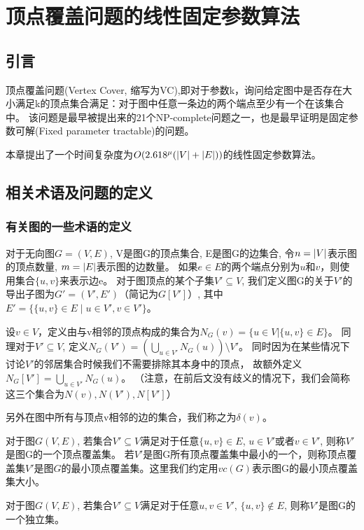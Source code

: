 \chapter{顶点覆盖问题的线性固定参数算法}
\section{引言}
顶点覆盖问题(Vertex Cover, 缩写为VC),即对于参数k，询问给定图中是否存在大小满足k的顶点集合满足：对于图中任意一条边的两个端点至少有一个在该集合中。
该问题是最早被提出来的21个NP-complete问题之一\cite{karp1972reducibility}，也是最早证明是固定参数可解(Fixed parameter tractable)的问题\cite{downey2012parameterized}。

本章提出了一个时间复杂度为$O(2.618^{\mu}(\left\vert V \right\vert + \left\vert E \right\vert))$的线性固定参数算法。

\section{相关术语及问题的定义}
\subsection{有关图的一些术语的定义}
对于无向图$G=(V,E)$, V是图G的顶点集合, E是图G的边集合, 令$n = \left\vert V \right\vert$表示图的顶点数量, $m = \left\vert E \right\vert$表示图的边数量。
如果$e \in E$的两个端点分别为$u$和$v$，则使用集合$\{u, v \}$来表示边e。
对于图顶点的某个子集$V' \subseteq V$, 我们定义图G的关于$V'$的导出子图为$G' = (V', E')$（简记为$G[V']$）, 其中$E' = \{\{u, v\} \in E\;|\;u \in V', v \in V' \}$。

设$v \in V$，定义由与v相邻的顶点构成的集合为$N_{G}(v) = \{ u \in V | \{u, v\} \in E\}$。
同理对于$V' \subseteq V$, 定义$N_{G}(V') = (\bigcup_{u \in V'}N_{G}(u)) \setminus V' $。
同时因为在某些情况下讨论$V'$的邻居集合时候我们不需要排除其本身中的顶点，
故额外定义$N_{G}[V'] = \bigcup_{u \in V'}N_{G}(u)$。
（注意，在前后文没有歧义的情况下，我们会简称这三个集合为$N(v), N(V'),N[V']$）

另外在图中所有与顶点v相邻的边的集合，我们称之为$\delta(v)$。

\begin{definition}[顶点覆盖集]
对于图$G(V, E)$, 若集合$V' \subseteq V$满足对于任意$\{u, v\} \in E$, $u \in V'$或者$v \in V'$, 则称$V'$是图G的一个顶点覆盖集。
若$V'$是图G所有顶点覆盖集中最小的一个，则称顶点覆盖集$V'$是图$G$的最小顶点覆盖集。这里我们约定用$vc(G)$表示图G的最小顶点覆盖集大小。
\end{definition}

\begin{definition}[独立集]
对于图$G(V, E)$, 若集合$V' \subseteq V$满足对于任意$u, v \in V'$, $\{u, v\} \notin E$, 则称$V'$是图G的一个独立集。
\end{definition}

